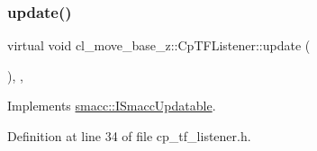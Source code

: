 \subsubsection{\texorpdfstring{update()}{update()}}
{\footnotesize\ttfamily virtual void cl\+\_\+move\+\_\+base\+\_\+z\+::\+Cp\+T\+F\+Listener\+::update (\begin{DoxyParamCaption}{ }\end{DoxyParamCaption})\hspace{0.3cm}{\ttfamily [inline]}, {\ttfamily [override]}, {\ttfamily [virtual]}}



Implements \hyperlink{classsmacc_1_1ISmaccUpdatable_a84ee0520cbefdb1d412bed54650b028e}{smacc\+::\+I\+Smacc\+Updatable}.



Definition at line 34 of file cp\+\_\+tf\+\_\+listener.\+h.


